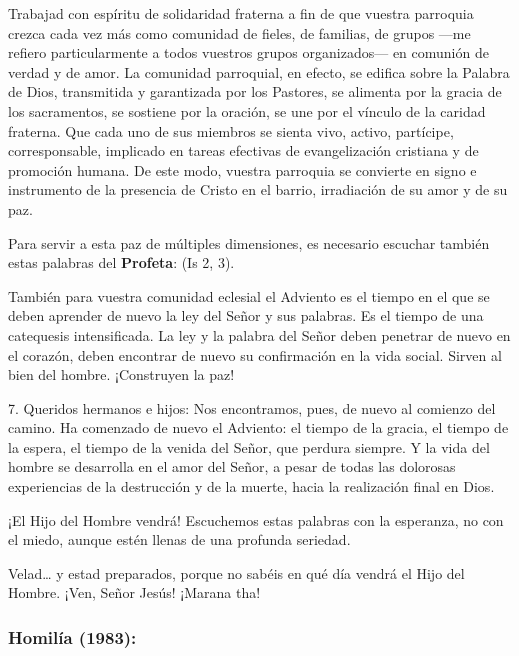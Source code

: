 Trabajad con espíritu de solidaridad fraterna a fin de que vuestra parroquia crezca cada vez más como comunidad de fieles, de familias, de grupos ---me refiero particularmente a todos vuestros grupos organizados--- en comunión de verdad y de amor. La comunidad parroquial, en efecto, se edifica sobre la Palabra de Dios, transmitida y garantizada por los Pastores, se alimenta por la gracia de los sacramentos, se sostiene por la oración, se une por el vínculo de la caridad fraterna. Que cada uno de sus miembros se sienta vivo, activo, partícipe, corresponsable, implicado en tareas efectivas de evangelización cristiana y de promoción humana. De este modo, vuestra parroquia se convierte en signo e instrumento de la presencia de Cristo en el barrio, irradiación de su amor y de su paz.

Para servir a esta paz de múltiples dimensiones, es necesario escuchar también estas palabras del \textbf{Profeta}:  (Is 2, 3).

También para vuestra comunidad eclesial el Adviento es el tiempo en el que se deben aprender de nuevo la ley del Señor y sus palabras. Es el tiempo de una catequesis intensificada. La ley y la palabra del Señor deben penetrar de nuevo en el corazón, deben encontrar de nuevo su confirmación en la vida social. Sirven al bien del hombre. ¡Construyen la paz!

7. Queridos hermanos e hijos: Nos encontramos, pues, de nuevo al comienzo del camino. Ha comenzado de nuevo el Adviento: el tiempo de la gracia, el tiempo de la espera, el tiempo de la venida del Señor, que perdura siempre. Y la vida del hombre se desarrolla en el amor del Señor, a pesar de todas las dolorosas experiencias de la destrucción y de la muerte, hacia la realización final en Dios.

¡El Hijo del Hombre vendrá! Escuchemos estas palabras con la esperanza, no con el miedo, aunque estén llenas de una profunda seriedad.

Velad\ldots{} y estad preparados, porque no sabéis en qué día vendrá el Hijo del Hombre. ¡Ven, Señor Jesús! ¡Marana tha!

\subsubsection{Homilía (1983):}

